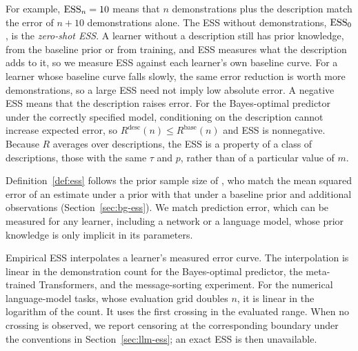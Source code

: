 For example, $\mathrm{ESS}_n=10$ means that $n$ demonstrations plus the description match the error of $n+10$ demonstrations alone. The ESS without demonstrations, $\mathrm{ESS}_0$, is the \emph{zero-shot ESS}. A learner without a description still has prior knowledge, from the baseline prior or from training, and ESS measures what the description adds to it, so we measure ESS against each learner's own baseline curve. For a learner whose baseline curve falls slowly, the same error reduction is worth more demonstrations, so a large ESS need not imply low absolute error. A negative ESS means that the description raises error. For the Bayes-optimal predictor under the correctly specified model, conditioning on the description cannot increase expected error, so $R^{\mathrm{desc}}(n)\le R^{\mathrm{base}}(n)$ and ESS is nonnegative. Because $R$ averages over descriptions, the ESS is a property of a class of descriptions, those with the same $\tau$ and $p$, rather than of a particular value of $m$.

Definition~\ref{def:ess} follows the prior sample size of \citet{reimherr2021}, who match the mean squared error of an estimate under a prior with that under a baseline prior and additional observations (Section~\ref{sec:bg-ess}). We match prediction error, which can be measured for any learner, including a network or a language model, whose prior knowledge is only implicit in its parameters.

Empirical ESS interpolates a learner's measured error curve. The interpolation is linear in the demonstration count for the Bayes-optimal predictor, the meta-trained Transformers, and the message-sorting experiment. For the numerical language-model tasks, whose evaluation grid doubles $n$, it is linear in the logarithm of the count. It uses the first crossing in the evaluated range. When no crossing is observed, we report censoring at the corresponding boundary under the conventions in Section~\ref{sec:llm-ess}; an exact ESS is then unavailable.
